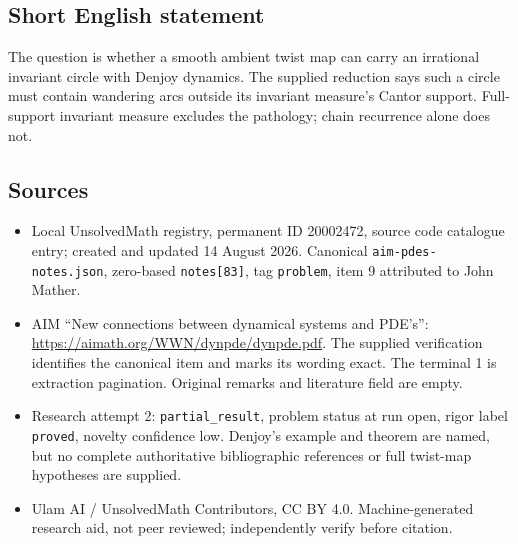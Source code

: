 \documentclass[11pt]{article}
\begin{document}
\subsection{Short English statement}
The question is whether a smooth ambient twist map can carry an irrational invariant circle with Denjoy dynamics. The supplied reduction says such a circle must contain wandering arcs outside its invariant measure's Cantor support. Full-support invariant measure excludes the pathology; chain recurrence alone does not.
\subsection{Sources}
\begin{itemize}
\item Local UnsolvedMath registry, permanent ID 20002472, source code catalogue entry; created and updated 14 August 2026. Canonical \texttt{aim-pdes-notes.json}, zero-based \texttt{notes[83]}, tag \texttt{problem}, item 9 attributed to John Mather.
\item AIM ``New connections between dynamical systems and PDE's'': \url{https://aimath.org/WWN/dynpde/dynpde.pdf}. The supplied verification identifies the canonical item and marks its wording exact. The terminal 1 is extraction pagination. Original remarks and literature field are empty.
\item Research attempt 2: \texttt{partial\_result}, problem status at run open, rigor label \texttt{proved}, novelty confidence low. Denjoy's example and theorem are named, but no complete authoritative bibliographic references or full twist-map hypotheses are supplied.
\item Ulam AI / UnsolvedMath Contributors, CC BY 4.0. Machine-generated research aid, not peer reviewed; independently verify before citation.
\end{itemize}
\end{document}
